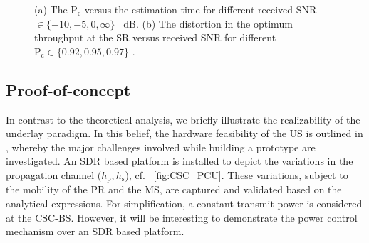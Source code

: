 \documentclass[draftcls, onecolumn, 11pt]{IEEEtran}
\newcommand{\sub}[1]{_{\text{#1}}}
\newcommand{\pc}{\text{P}\sub{c}}
\newcommand{\hp}{h\sub{p}}
\newcommand{\hs}{h\sub{s}}
\begin{document}
\begin{figure}[!t]
\hfil
{}
\caption{
(a) The $\pc$ versus the estimation time for different received SNR $\in \{-10,-5,0, \infty\}$ \SI{}{dB}. %
(b) The distortion in the optimum throughput at the SR versus received SNR for different $\pc \in \{0.92, 0.95, 0.97\}$ \cite{Kaushik15}.}
\label{fig:PP_U}
\end{figure}

\subsection*{Proof-of-concept}
In contrast to the theoretical analysis, we briefly illustrate the realizability of the underlay paradigm. In this belief, the hardware feasibility of the US is outlined in \cite{Kaushik14}, whereby the major challenges involved while building a prototype are investigated. An SDR based platform is installed to depict the variations in the propagation channel ($\hp, \hs$), cf. \figurename~\ref{fig:CSC_PCU}. These variations, subject to the mobility of the PR and the MS, are captured and validated based on the analytical expressions. For simplification, a constant transmit power is considered at the CSC-BS. However, it will be interesting to demonstrate the power control mechanism over an SDR based platform. 
\end{document}
